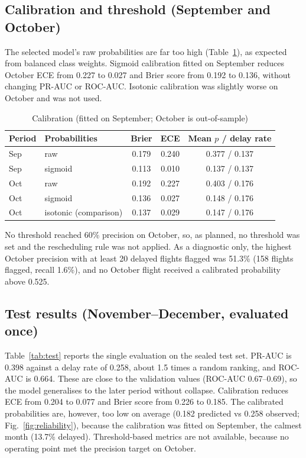 \subsection{Calibration and threshold (September and October)}
The selected model's raw probabilities are far too high (Table~\ref{tab:calib}), as expected from
balanced class weights. Sigmoid calibration fitted on September reduces October ECE from 0.227 to
0.027 and Brier score from 0.192 to 0.136, without changing PR-AUC or ROC-AUC. Isotonic calibration
was slightly worse on October and was not used.

\begin{table}[htbp]
\centering
\caption{Calibration (fitted on September; October is out-of-sample)}
\label{tab:calib}
\begin{tabular}{llccc}
\toprule
Period & Probabilities & Brier & ECE & Mean $p$ / delay rate \\
\midrule
Sep & raw & 0.179 & 0.240 & 0.377 / 0.137 \\
Sep & sigmoid & 0.113 & 0.010 & 0.137 / 0.137 \\
Oct & raw & 0.192 & 0.227 & 0.403 / 0.176 \\
Oct & sigmoid & 0.136 & 0.027 & 0.148 / 0.176 \\
Oct & isotonic (comparison) & 0.137 & 0.029 & 0.147 / 0.176 \\
\bottomrule
\end{tabular}
\end{table}

No threshold reached 60\% precision on October, so, as planned, no threshold was set and the
rescheduling rule was not applied. As a diagnostic only, the highest October precision with at
least 20 delayed flights flagged was 51.3\% (158 flights flagged, recall 1.6\%), and no October
flight received a calibrated probability above 0.525.

\subsection{Test results (November--December, evaluated once)}
Table~\ref{tab:test} reports the single evaluation on the sealed test set. PR-AUC is 0.398 against
a delay rate of 0.258, about 1.5 times a random ranking, and ROC-AUC is 0.664. These are close to
the validation values (ROC-AUC 0.67--0.69), so the model generalises to the later period without
collapse. Calibration reduces ECE from 0.204 to 0.077 and Brier score from 0.226 to 0.185. The
calibrated probabilities are, however, too low on average (0.182 predicted vs 0.258 observed;
Fig.~\ref{fig:reliability}), because the calibration was fitted on September, the calmest month
(13.7\% delayed). Threshold-based metrics are not available, because no operating point met the
precision target on October.

